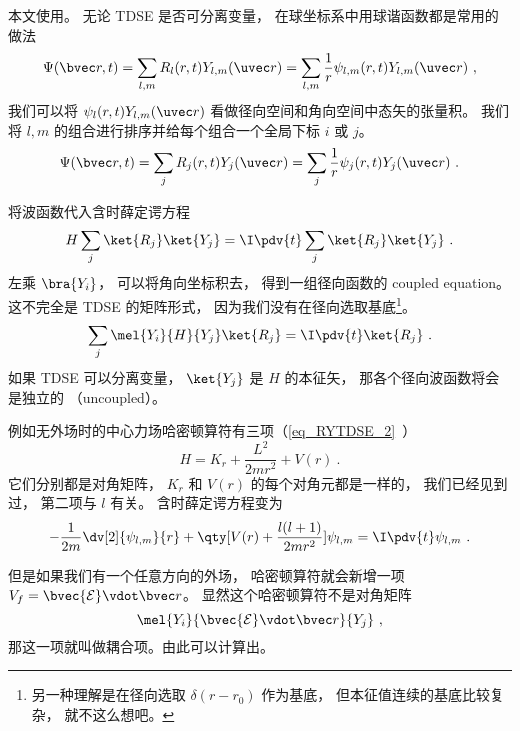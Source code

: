 
\begin{issues}
\issueAbstract
{}
\end{issues}


本文使用。 无论 TDSE 是否可分离变量， 在球坐标系中用球谐函数都是常用的做法
\begin{equation}\label{eq_RYTDSE_1}
\Psi(\bvec r, t) = \sum_{l,m} R_l (r, t) Y_{l,m} (\uvec r) = \sum_{l,m} \frac{1}{r} \psi_{l,m} (r, t) Y_{l,m} (\uvec r)~,
\end{equation}
我们可以将 $\psi_l (r, t) Y_{l,m} (\uvec r)$ 看做径向空间和角向空间中态矢的张量积。 我们将 $l, m$ 的组合进行排序并给每个组合一个全局下标 $i$ 或 $j$。
\begin{equation}
\Psi(\bvec r, t) = \sum_j R_j (r, t) Y_j (\uvec r) = \sum_j \frac{1}{r} \psi_j (r, t) Y_j (\uvec r)~.
\end{equation}

将波函数代入含时薛定谔方程
\begin{equation}
H \sum_j\ket{R_j}\ket{Y_j} = \I \pdv{t}  \sum_j\ket{R_j}\ket{Y_j}~.
\end{equation}
左乘 $\bra{Y_i}$， 可以将角向坐标积去， 得到一组径向函数的 coupled equation。 这不完全是 TDSE 的矩阵形式， 因为我们没有在径向选取基底\footnote{另一种理解是在径向选取 $\delta(r - r_0)$ 作为基底， 但本征值连续的基底比较复杂， 就不这么想吧。}。
\begin{equation}
\sum_j \mel{Y_i}{H}{Y_j} \ket{R_j} = \I \pdv{t} \ket{R_j}~.
\end{equation}
如果 TDSE 可以分离变量， $\ket{Y_j}$ 是 $H$ 的本征矢， 那各个径向波函数将会是独立的 （uncoupled）。

例如无外场时的中心力场哈密顿算符有三项（\autoref{eq_RYTDSE_2}~）
\begin{equation}
H = K_r + \frac{L^2}{2mr^2} + V(r)~.
\end{equation}
它们分别都是对角矩阵， $K_r$ 和 $V(r)$ 的每个对角元都是一样的， 我们已经见到过， 第二项与 $l$ 有关。 含时薛定谔方程变为
\begin{equation}
-\frac{1}{2m} \dv[2]{\psi_{l,m}}{r} + \qty[V(r) + \frac{l(l + 1)}{2mr^2}]\psi_{l,m} = \I \pdv{t} \psi_{l,m}~.
\end{equation}

但是如果我们有一个任意方向的外场， 哈密顿算符就会新增一项 $V_f = \bvec{\mathcal E} \vdot \bvec r$。 显然这个哈密顿算符不是对角矩阵
\begin{equation}
\mel{Y_i}{\bvec{\mathcal E} \vdot \bvec r}{Y_j}~,
\end{equation}
那这一项就叫做耦合项。由此可以计算出。

